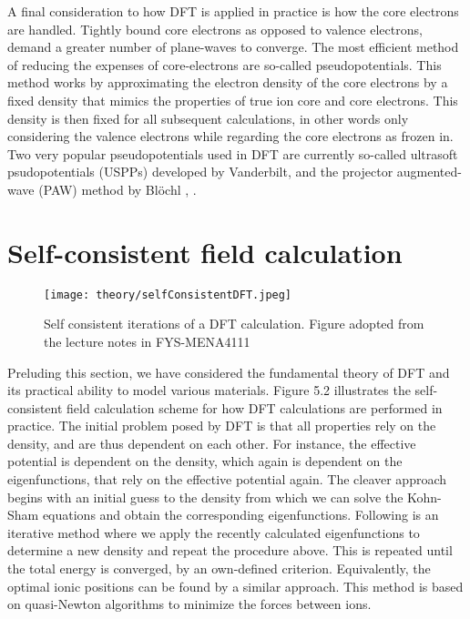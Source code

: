 A final consideration to how DFT is applied in practice is how the core electrons are handled. Tightly bound core electrons as opposed to valence electrons, demand a greater number of plane-waves to converge. The most efficient method of reducing the expenses of core-electrons are so-called pseudopotentials. This method works by approximating the electron density of the core electrons by a fixed density that mimics the properties of true ion core and core electrons. This density is then fixed for all subsequent calculations, in other words only considering the valence electrons while regarding the core electrons as frozen in. Two very popular pseudopotentials used in DFT are currently so-called ultrasoft psudopotentials (USPPs) developed by Vanderbilt, and the projector augmented-wave (PAW) method by Bl\"{o}chl \cite{PAW1}, \cite{PAW2}.

\section{Self-consistent field calculation}

\begin{figure}[H]
\centering
\texttt{[image: theory/selfConsistentDFT.jpeg]}
\caption{Self consistent iterations of a DFT calculation. Figure adopted from the lecture notes in FYS-MENA4111 \cite{persson2020}}
\end{figure}

Preluding this section, we have considered the fundamental theory of DFT and its practical ability to model various materials. Figure 5.2 illustrates the self-consistent field calculation scheme for how DFT calculations are performed in practice. The initial problem posed by DFT is that all properties rely on the density, and are thus dependent on each other. For instance, the effective potential is dependent on the density, which again is dependent on the eigenfunctions, that rely on the effective potential again. The cleaver approach begins with an initial guess to the density from which we can solve the Kohn-Sham equations and obtain the corresponding eigenfunctions. Following is an iterative method where we apply the recently calculated eigenfunctions to determine a new density and repeat the procedure above. This is repeated until the total energy is converged, by an own-defined criterion. Equivalently, the optimal ionic positions can be found by a similar approach. This method is based on quasi-Newton algorithms to minimize the forces between ions. 



